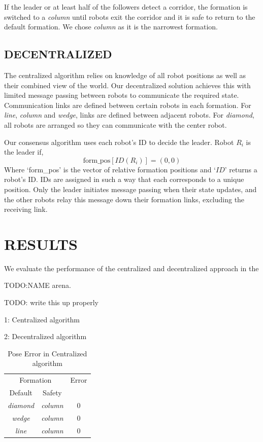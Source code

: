 \documentclass[letterpaper, 10 pt, conference]{ieeeconf}  %
\begin{document}
If the leader or at least half of the followers detect a corridor, the formation is switched to a \textit{column} until robots exit the corridor and it is safe to return to the default formation. We chose \textit{column} as it is the narrowest formation.

\subsection{DECENTRALIZED}

The centralized algorithm relies on knowledge of all robot positions as well as their combined view of the world. Our decentralized solution achieves this with limited message passing between robots to communicate the required state. Communication links are defined between certain robots in each formation. For \textit{line}, \textit{column} and \textit{wedge}, links are defined between adjacent robots. For \textit{diamond}, all robots are arranged so they can communicate with the center robot.

Our consensus algorithm uses each robot's ID to decide the leader. Robot $R_i$ is the leader if,
\[\text{form\_pos}[ID(R_i)] = (0,0)\]
Where `form\_pos' is the vector of relative formation positions and `$ID$' returns a robot's ID. IDs are assigned in such a way that each corresponds to a unique position. Only the leader initiates message passing when their state updates, and the other robots relay this message down their formation links, excluding the receiving link.

\section{RESULTS}

We evaluate the performance of the centralized and decentralized approach in the

TODO:NAME arena.

TODO: write this up properly

1: Centralized algorithm

2: Decentralized algorithm
	
\begin{table}[h]
\begin{center}
\begin{tabular}{|c c|c|}
\hline
\multicolumn{2}{|c|}{Formation} & Error \\
Default & Safety & \\
\hline
\textit{diamond}    & \textit{column} & 0 \\
\textit{wedge}       & \textit{column} & 0 \\
\textit{line}           & \textit{column} & 0 \\
\hline
\end{tabular}
\end{center}
\caption{Pose Error in Centralized algorithm}
\label{table_results_centralized}
\end{table}
\end{document}
